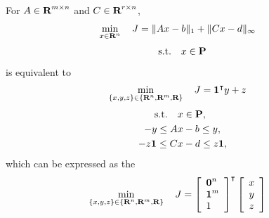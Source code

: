 \documentclass{article}
\begin{document}
    For $A\in\textbf{R}^{m\times n}$ and $C\in\textbf{R}^{r\times n}$,
    \begin{align*}
        \min_{x\in\textbf{R}^n}\quad J & = 
                        \|A x - b\|_1
                        +   \|C x - d \|_\infty
    \end{align*}
    \begin{align*}
        \text{s.t.}\quad x\in\textbf{P}
    \end{align*}
    is equivalent to
    \begin{align*}
    \min_{\{x,y,z\}\in\{\textbf{R}^n,\textbf{R}^m,\textbf{R}\}}
    \quad J & =  \textbf{1}^\intercal y +z
    \end{align*}
    \begin{align*}
        \text{s.t.}\quad &x\in\textbf{P},
        \\
            -y \leq A & x - b \leq y,
            \\
        -z\textbf{1} \leq C & x - d \leq z\textbf{1},
    \end{align*}
    which can be expressed as the \LP
    \begin{align*}
        \min_{\{x,y,z\}\in\{\textbf{R}^n,\textbf{R}^m,\textbf{R}\}} \quad 
        J & = 
        \left[\begin{array}{l}
            \textbf{0}^{n}
            \\
            \textbf{1}^{m}
            \\
            1
        \end{array}\right]^\intercal
        \left[\begin{array}{c}
            x   \\
            y   \\
            z
        \end{array}\right]
    \end{align*}
\end{document}
